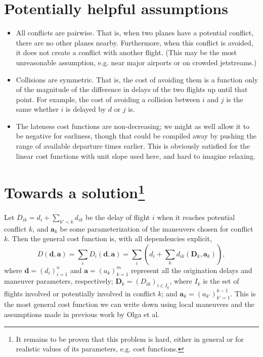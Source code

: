 \documentclass{article}
\begin{document}
\section{Potentially helpful assumptions}
\begin{itemize}
\item All conflicts are pairwise. That is, when two planes have a potential conflict, there are no other planes nearby. 
Furthermore, when this conflict is avoided, it does not create a conflict with another flight. 
(This may be the most unreasonable assumption, e.g. near major airports or on crowded jetstreams.)
\item Collisions are symmetric. That is, the cost of avoiding them is a function only of the magnitude of the difference in delays of the two flights up until that point. For example, the cost of avoiding a collision between $i$ and $j$ is the same whether $i$ is delayed by $d$ or $j$ is.
\item The lateness cost functions are non-decreasing; we might as well allow it to be negative for earliness, though that could be compiled away by pushing the range of available departure times earlier. This is obviously satisfied for the linear cost functions with unit slope used here, and hard to imagine relaxing.
\end{itemize}

\section[Towards a solution] {Towards a solution\footnote{
It remains to be proven that this problem is hard, either in general or for realistic values of its parameters, e.g. cost functions.}}

Let $D_{ik} = d_i + \sum_{k' < k} d_{ik}$ be the delay of flight $i$ when it reaches potential conflict $k$, and $\mathbf a_k$ be some parameterization of the maneuvers chosen for conflict $k$.
Then the general cost function is, with all dependencies explicit,
\begin{equation*}
D(\mathbf d, \mathbf a) = \sum_i D_i(\mathbf d, \mathbf a)
= 
\sum_i \left(d_i + \sum_k d_{ik} (\mathbf D_{k}, \mathbf a_k)\right),
\end{equation*}
where $\mathbf d = (d_i)_{i=1}^n$ and $\mathbf a = (a_k)_{k=1}^m$ represent all the origination delays and maneuver parameters, respectively; $\mathbf D_k = (D_{ik})_{i \in I_k}$, where $I_k$ is the set of flights involved or potentially involved in conflict $k$; and $\mathbf a_k = (a_{k'})_{k'=1}^{k-1}$.
This is the most general cost function we can write down using local maneuvers and the assumptions made in previous work by Olga et al.
\end{document}
